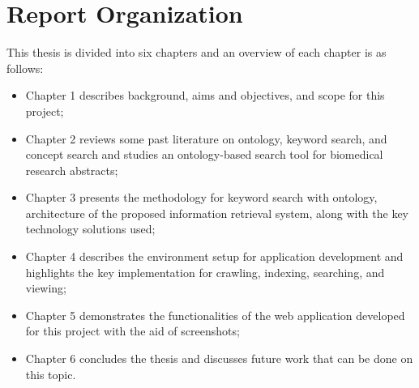 \section{Report Organization}
This thesis is divided into six chapters and an overview of each chapter is as follows:

\begin{itemize}
\item Chapter 1 describes background, aims and objectives, and scope for this project;
\item Chapter 2 reviews some past literature on ontology, keyword search, and concept search and studies an ontology-based search tool for biomedical research abstracts;
\item Chapter 3 presents the methodology for keyword search with ontology, architecture of the proposed information retrieval system, along with the key technology solutions used;
\item Chapter 4 describes the environment setup for application development and highlights the key implementation for crawling, indexing, searching, and viewing;
\item Chapter 5 demonstrates the functionalities of the web application developed for this project with the aid of screenshots;
\item Chapter 6 concludes the thesis and discusses future work that can be done on this topic. 
\end{itemize}